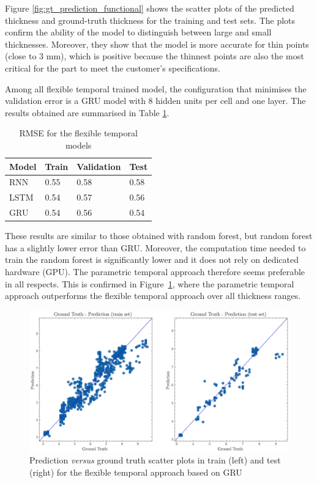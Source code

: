Figure \ref{fig:gt_prediction_functional} shows the scatter plots of the predicted thickness and ground-truth thickness for the training and test sets. The plots confirm the ability of the model to distinguish between large and small thicknesses. Moreover, they show that the model is more accurate for thin points (close to 3 mm), which is positive because the thinnest points are also the most critical for the part to meet the customer's specifications.

Among all flexible temporal trained model, the configuration that minimises the validation error is a GRU model with 8 hidden units per cell and one layer. The results obtained are summarised in Table \ref{tab:temporal_model_results}.
%
\begin{table}
    \centering
    \caption{RMSE for the flexible temporal models}
    \begin{tabular}{llll}
    \toprule
    \textbf{Model} & \textbf{Train}  & \textbf{Validation}  & \textbf{Test}  \\
    \midrule
    RNN & {0.55} & {0.58} & {0.58} \\
    LSTM & {0.54} & {0.57} & {0.56} \\
    GRU & {0.54} & {0.56} & {0.54} \\
    
    \bottomrule
    \end{tabular}
    \label{tab:temporal_model_results}
\end{table}
%
These results are similar to those obtained with random forest, but random forest has a slightly lower error than GRU. Moreover, the computation time needed to train the random forest is significantly lower and it does not rely on dedicated hardware (GPU). The parametric temporal approach therefore seems preferable in all respects. This is confirmed in Figure~\ref{fig:gt_prediction_temporal}, where the parametric temporal approach outperforms the flexible temporal approach over all thickness ranges.
\begin{figure}
\centering
\includegraphics[scale=0.48]{images/chapter_4/gt_temporal.eps}
\caption{Prediction \textit{versus} ground truth scatter plots in train (left) and test (right) for the flexible temporal approach based on GRU}
\label{fig:gt_prediction_temporal}
\end{figure}

